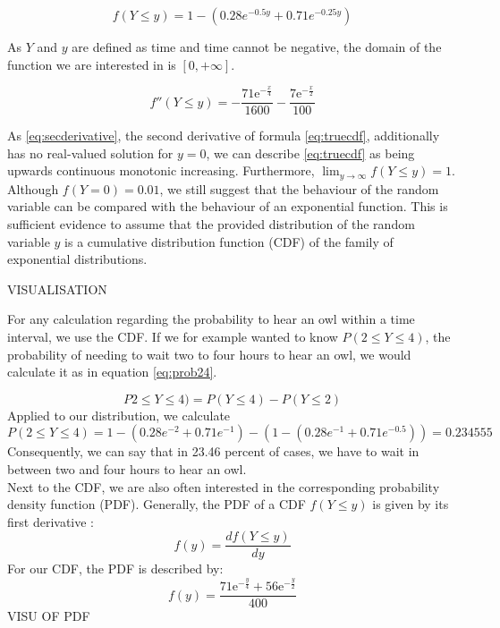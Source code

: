 \begin{equation}  f(Y \leq y) =1-( 0.28e^{-0.5y} + 0.71e^{-0.25y})
\label{eq:truecdf}
\end{equation}

As $Y$ and $y$ are defined as time and time cannot be negative, the domain of the function we are interested in is $[0,+\infty]$.

\begin{equation} f''(Y \leq y) = -\frac{71\mathrm{e}^{-\frac{x}{4}}}{1600}-\frac{7\mathrm{e}^{-\frac{x}{2}}}{100}
\label{eq:secderivative}
\end{equation}

As \ref{eq:secderivative}, the second derivative of formula \ref{eq:truecdf},  additionally has no real-valued solution for $y=0$, we can describe \ref{eq:truecdf} as being upwards continuous monotonic increasing. Furthermore, $\lim_{y\to\infty} f(Y \leq y) = 1$. Although $f(Y = 0) = 0.01$, we still suggest that the behaviour of the random variable can  be compared with the behaviour of an exponential function. This is sufficient evidence to assume that the provided distribution of the random variable $y$ is a cumulative distribution function (CDF) of the family of exponential distributions. 

VISUALISATION


For any calculation regarding the probability to hear an owl within a time interval, we use the CDF. If we for example wanted to know $P(2 \leq Y \leq 4)$, the probability of needing to wait two to four hours to hear an owl, we would calculate it as in equation \ref{eq:prob24}.

\begin{equation} P2 \leq Y \leq 4) = P(Y \leq 4) - P(Y \leq 2)
\label{eq:prob24}
\end{equation}
Applied to our distribution, we calculate
\begin{equation} P(2 \leq Y \leq 4) =1-( 0.28e^{-2} + 0.71e^{-1}) -( 1-( 0.28e^{-1} + 0.71e^{-0.5})) = 0.234555
\label{eq:probcalc24}
\end{equation}
Consequently, we can say that in 23.46 percent of cases, we have to wait in between two and four hours to hear an owl.
\\

Next to the CDF, we are also often interested in the corresponding probability density function (PDF). Generally, the PDF of a CDF $f(Y \leq y)$ is given by its first derivative \cite[Chapter~4.3]{montgomery2010applied}:
\begin{equation}
f(y) = \frac{df(Y \leq y)}{dy}
\label{eq:firstderivative}
\end{equation}
For our CDF, the PDF is described by:
\begin{equation}
f(y) = \dfrac{71\mathrm{e}^{-\frac{y}{4}}+56\mathrm{e}^{-\frac{y}{2}}}{400}
\label{eq:pdf}
\end{equation}
VISU OF PDF

